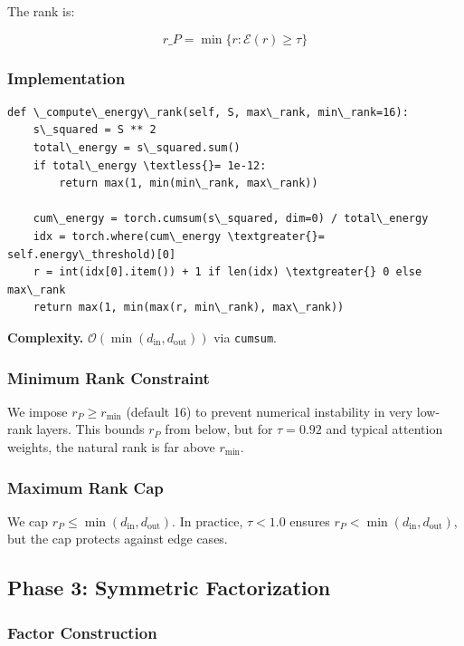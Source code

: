 The rank is:

\[
r\_P = \min\{r : \mathcal{E}(r) \geq \tau\}
\tag{4.3}
\]

\subsubsection{Implementation}

\begin{lstlisting}
def \_compute\_energy\_rank(self, S, max\_rank, min\_rank=16):
    s\_squared = S ** 2
    total\_energy = s\_squared.sum()
    if total\_energy \textless{}= 1e-12:
        return max(1, min(min\_rank, max\_rank))
    
    cum\_energy = torch.cumsum(s\_squared, dim=0) / total\_energy
    idx = torch.where(cum\_energy \textgreater{}= self.energy\_threshold)[0]
    r = int(idx[0].item()) + 1 if len(idx) \textgreater{} 0 else max\_rank
    return max(1, min(max(r, min\_rank), max\_rank))
\end{lstlisting}

\textbf{Complexity.} $\mathcal{O}(\min(d_\text{in}, d_\text{out}))$ via \texttt{cumsum}.

\subsubsection{Minimum Rank Constraint}

We impose $r_P \geq r_\text{min}$ (default 16) to prevent numerical 
instability in very low-rank layers. This bounds $r_P$ from below, but for 
$\tau = 0.92$ and typical attention weights, the natural rank is far above 
$r_\text{min}$.

\subsubsection{Maximum Rank Cap}

We cap $r_P \leq \min(d_\text{in}, d_\text{out})$. In practice, $\tau < 1.0$ 
ensures $r_P < \min(d_\text{in}, d_\text{out})$, but the cap protects against 
edge cases.

\subsection{Phase 3: Symmetric Factorization}

\subsubsection{Factor Construction}

